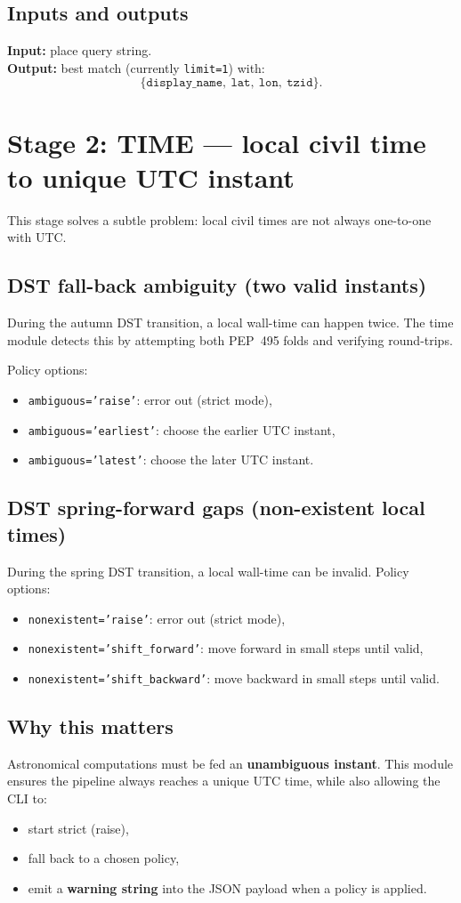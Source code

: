 \documentclass[11pt,a4paper]{article}
\begin{document}
\subsection{Inputs and outputs}
\textbf{Input:} place query string.\\
\textbf{Output:} best match (currently \texttt{limit=1}) with:
\[
\{\texttt{display\_name},\ \texttt{lat},\ \texttt{lon},\ \texttt{tzid}\}.
\]

\section{Stage 2: TIME --- local civil time to unique UTC instant}
This stage solves a subtle problem: local civil times are not always one-to-one with UTC.

\subsection{DST fall-back ambiguity (two valid instants)}
During the autumn DST transition, a local wall-time can happen twice.
The time module detects this by attempting both PEP~495 folds and verifying round-trips.

Policy options:
\begin{itemize}
  \item \texttt{ambiguous='raise'}: error out (strict mode),
  \item \texttt{ambiguous='earliest'}: choose the earlier UTC instant,
  \item \texttt{ambiguous='latest'}: choose the later UTC instant.
\end{itemize}

\subsection{DST spring-forward gaps (non-existent local times)}
During the spring DST transition, a local wall-time can be invalid.
Policy options:
\begin{itemize}
  \item \texttt{nonexistent='raise'}: error out (strict mode),
  \item \texttt{nonexistent='shift\_forward'}: move forward in small steps until valid,
  \item \texttt{nonexistent='shift\_backward'}: move backward in small steps until valid.
\end{itemize}

\subsection{Why this matters}
Astronomical computations must be fed an \textbf{unambiguous instant}.
This module ensures the pipeline always reaches a unique UTC time, while also allowing the CLI to:
\begin{itemize}
  \item start strict (raise),
  \item fall back to a chosen policy,
  \item emit a \textbf{warning string} into the JSON payload when a policy is applied.
\end{itemize}
\end{document}
